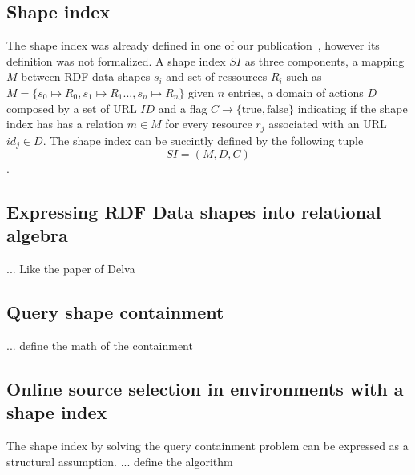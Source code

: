 \iffalse
While BQPs are syntactic objects, we shall use them as a represen-
tation of Linked Data queries which have a certain semantics. In the
remainder of this section we define this semantics. Due to the open-
ness and distributed nature of Webs such as the WWW we cannot
guarantee query results that are complete w.r.t. all Linked Data on
a Web. Nonetheless, we aim to provide a well-defined semantics.
Consequently, we have to limit our understanding of completeness.
However, instead of restricting ourselves to data from a fixed set
of sources selected or discovered beforehand, we introduce an ap-
proach that allows a query to make use of previously unknown data
and sources. Our definition of query semantics is based on a two-
phase approach: First, we define the part of a Web of Linked Data
that is reached by traversing links using the identifiers in a query
as a starting point. Then, we formalize the result of such a query
as the set of all valuations that map the query to a subset of all
data in the reachable part of the Web. Notice, while this two-phase
approach provides for a straightforward definition of the query se-
mantics in our model, it does not correspond to the actual query
execution strategy of integrating the traversal of data links into the
query execution process as illustrated in Section 2.
\fi



\fi

\subsection{Shape index}
The shape index was already defined in one of our publication~\cite{tam2024opportunitiesshapebasedoptimizationlink}, however its definition was not formalized.
A shape index $SI$ as three components, a mapping $M$ between RDF data shapes $s_i$ and set of ressources $R_i$ such as $M = \{s_0 \mapsto R_0, s_1 \mapsto R_1..., s_n \mapsto R_n\}$ given $n$ entries,
a domain of actions $D$ composed by a set of URL $ID$ and
a flag $C\rightarrow \{\mathrm{true}, \mathrm{false}\}$ indicating if the shape index has has a relation $m \in M$ for every resource $r_j$ associated with an URL $id_j \in D$. 
The shape index can be succintly defined by the following tuple 
\begin{equation}
SI = (M, D, C)
\end{equation}.

\subsection{Expressing RDF Data shapes into relational algebra}
... 
Like the paper of Delva

\subsection{Query shape containment}
...
define the math of the containment


\subsection{Online source selection in environments with a shape index}

The shape index by solving the query containment problem can be expressed as a structural assumption.
... define the algorithm